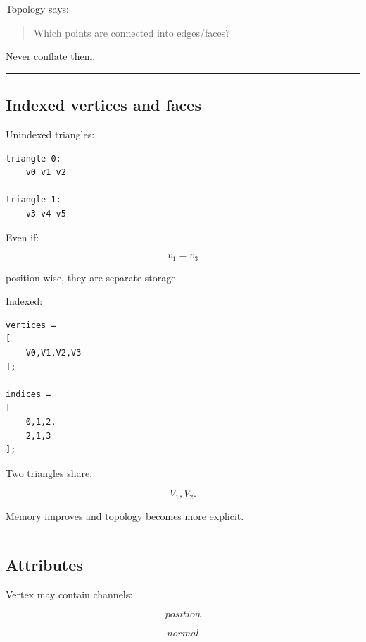 Topology says:

\begin{quote}
Which points are connected into edges/faces?
\end{quote}

Never conflate them.

\begin{center}\rule{0.5\linewidth}{0.5pt}\end{center}

\subsection{Indexed vertices and faces}\label{04-visual-computing-ii-ch040-indexed-vertices-and-faces}

\hypertarget{04-visual-computing-ii-ch040-indexed-vertices-and-faces}{}

Unindexed triangles:

\begin{verbatim}
triangle 0:
    v0 v1 v2

triangle 1:
    v3 v4 v5
\end{verbatim}

Even if:

\[
v_1=v_3
\]

position-wise, they are separate storage.

Indexed:

\begin{verbatim}
vertices =
[
    V0,V1,V2,V3
];

indices =
[
    0,1,2,
    2,1,3
];
\end{verbatim}

Two triangles share:

\[
V_1,V_2.
\]

Memory improves and topology becomes more explicit.

\begin{center}\rule{0.5\linewidth}{0.5pt}\end{center}

\subsection{Attributes}\label{04-visual-computing-ii-ch040-attributes}

\hypertarget{04-visual-computing-ii-ch040-attributes}{}

Vertex may contain channels:

\[
position
\]

\[
normal
\]

